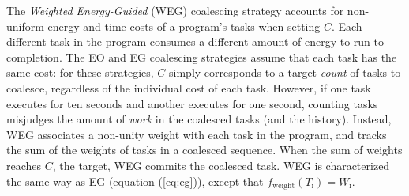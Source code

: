 The \emph{Weighted Energy-Guided} (WEG) coalescing strategy accounts for non-uniform energy and time costs of a program's tasks when setting $C$. Each different task in the program consumes a different amount of energy to run to completion. The EO and EG coalescing strategies assume that each task has the same cost: for these strategies, $C$ simply corresponds to a target {\em count} of tasks to coalesce, regardless of the individual cost of each task. However, if one task executes for ten seconds and another executes for one second, counting tasks misjudges the amount of {\em work} in the coalesced tasks (and the history).
%
Instead, WEG associates a non-unity weight with each task in the program, and tracks the sum of the weights of tasks in a coalesced sequence. When the sum of weights reaches $C$, the target, WEG commits the coalesced task.
WEG is characterized the same way as EG (equation (\ref{eq:eg})), except that $f_\text{weight}(T_\text{i}) = W_\text{i}$.
%
